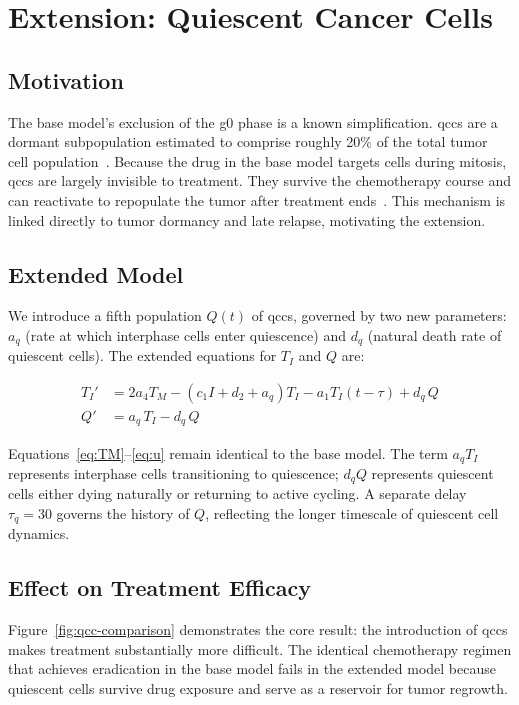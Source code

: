 \section{Extension: Quiescent Cancer Cells}
\label{sec:extension}

\subsection{Motivation}

The base model's exclusion of the \gls{g0} phase is a known simplification. \gls{qcc}s are a dormant subpopulation estimated to comprise roughly 20\% of the total tumor cell population~\cite{villasana_delay_2003}. Because the drug in the base model targets cells during mitosis, \gls{qcc}s are largely invisible to treatment. They survive the chemotherapy course and can reactivate to repopulate the tumor after treatment ends~\cite{rhim_tumor_2019}. This mechanism is linked directly to tumor dormancy and late relapse, motivating the extension.

\subsection{Extended Model}

We introduce a fifth population $Q(t)$ of \gls{qcc}s, governed by two new parameters: $a_q$ (rate at which interphase cells enter quiescence) and $d_q$ (natural death rate of quiescent cells). The extended equations for $T_I$ and $Q$ are:

\begin{align}
  T_I' &= 2a_4T_M - (c_1I + d_2 + a_q)T_I - a_1T_I(t-\tau) + d_q\, Q \\
  Q'   &= a_q\, T_I - d_q\, Q
\end{align}

Equations~\ref{eq:TM}--\ref{eq:u} remain identical to the base model. The term $a_q T_I$ represents interphase cells transitioning to quiescence; $d_q Q$ represents quiescent cells either dying naturally or returning to active cycling. A separate delay $\tau_q = 30$ governs the history of $Q$, reflecting the longer timescale of quiescent cell dynamics.

\subsection{Effect on Treatment Efficacy}

Figure~\ref{fig:qcc-comparison} demonstrates the core result: the introduction of \gls{qcc}s makes treatment substantially more difficult. The identical chemotherapy regimen that achieves eradication in the base model fails in the extended model because quiescent cells survive drug exposure and serve as a reservoir for tumor regrowth.

